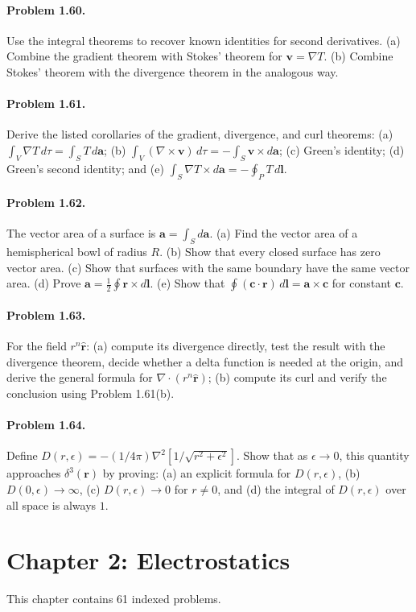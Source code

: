 \documentclass{aa}
\newcommand{\problemstatement}[2]{%
\paragraph{Problem #1.}#2\par\medskip
}
\begin{document}
\problemstatement{1.60}{Use the integral theorems to recover known identities for second derivatives. (a) Combine the gradient theorem with Stokes' theorem for \(\mathbf v=\nabla T\). (b) Combine Stokes' theorem with the divergence theorem in the analogous way.}
\problemstatement{1.61}{Derive the listed corollaries of the gradient, divergence, and curl theorems: (a) \(\int_V \nabla T\,d\tau = \int_S T\,d\mathbf a\); (b) \(\int_V (\nabla\times\mathbf v)\,d\tau = -\int_S \mathbf v\times d\mathbf a\); (c) Green's identity; (d) Green's second identity; and (e) \(\int_S \nabla T \times d\mathbf a = -\oint_P T\,d\mathbf l\).}
\problemstatement{1.62}{The vector area of a surface is \(\mathbf a=\int_S d\mathbf a\). (a) Find the vector area of a hemispherical bowl of radius \(R\). (b) Show that every closed surface has zero vector area. (c) Show that surfaces with the same boundary have the same vector area. (d) Prove \(\mathbf a = \frac12\oint \mathbf r\times d\mathbf l\). (e) Show that \(\oint (\mathbf c\cdot\mathbf r)\,d\mathbf l = \mathbf a\times\mathbf c\) for constant \(\mathbf c\).}
\problemstatement{1.63}{For the field \(r^n\hat{\mathbf r}\): (a) compute its divergence directly, test the result with the divergence theorem, decide whether a delta function is needed at the origin, and derive the general formula for \(\nabla\cdot(r^n\hat{\mathbf r})\); (b) compute its curl and verify the conclusion using Problem 1.61(b).}
\problemstatement{1.64}{Define \(D(r,\epsilon)=-(1/4\pi)\nabla^2[1/\sqrt{r^2+\epsilon^2}]\). Show that as \(\epsilon\to0\), this quantity approaches \(\delta^3(\mathbf r)\) by proving: (a) an explicit formula for \(D(r,\epsilon)\), (b) \(D(0,\epsilon)\to\infty\), (c) \(D(r,\epsilon)\to0\) for \(r\neq0\), and (d) the integral of \(D(r,\epsilon)\) over all space is always \(1\).}

\section{Chapter 2: Electrostatics}
This chapter contains 61 indexed problems.
\end{document}
